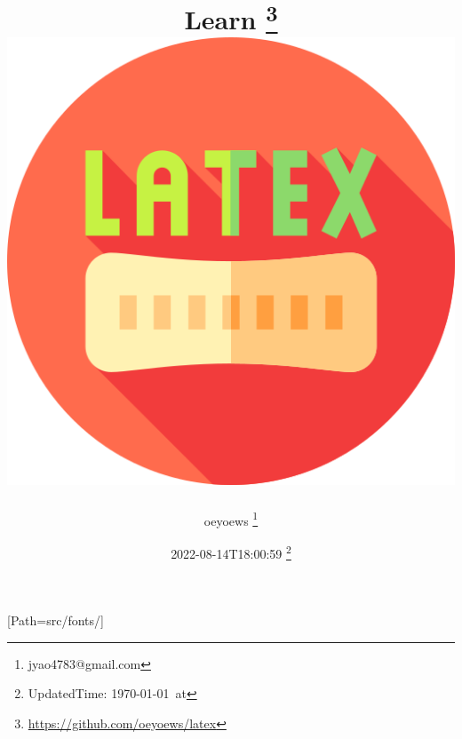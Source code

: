 \usepackage{
	emoji,
	docmute,
	amsmath,
	graphicx,
	float,
	hyperref,
	datetime,
	import,
	pdfpages,
	xcolor,
	transparent,
}

\newcommand{\incfig}[2][1]{%
	\def\svgwidth{#1\columnwidth}
	{#2.pdf_tex}
}

\title{
{ Learn \LaTeXe{}}
	{\thanks{\url{https://github.com/oeyoews/latex}}} \\
{\includegraphics[scale=0.2]{latex}}
}
\author{ oeyoews \thanks{jyao4783@gmail.com}}
\date{ 2022-08-14T18:00:59 \thanks{UpdatedTime: \today\ at \currenttime}}

[Path={src/fonts/}] %
\setcounter{tocdepth}{1} %
\graphicspath{{src/img/}} %
\hypersetup{colorlinks=true,} %
